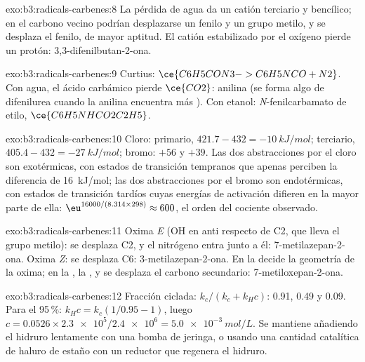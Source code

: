 \begin{solution}{exo:b3:radicals-carbenes:8}
La pérdida de agua da un catión terciario y bencílico; en el carbono vecino podrían desplazarse un fenilo
y un grupo metilo, y se desplaza el fenilo, de mayor aptitud. El
catión estabilizado por el oxígeno pierde un protón: 3,3-difenilbutan-2-ona.
\end{solution}

\begin{solution}{exo:b3:radicals-carbenes:9}
Curtius: $\ce{C6H5CON3 -> C6H5NCO + N2}$. Con agua, el ácido carbámico pierde $\ce{CO2}$: anilina
(se forma algo de difenilurea cuando la anilina encuentra más ). Con etanol: \textit{N}-fenilcarbamato
de etilo, $\ce{C6H5NHCO2C2H5}$.
\end{solution}

\begin{solution}{exo:b3:radicals-carbenes:10}
Cloro: primario, $421.7 - 432 = \qty{-10}{kJ/mol}$; terciario, $405.4 - 432 = \qty{-27}{kJ/mol}$; bromo: $+56$ y
$+39$. Las dos abstracciones por el cloro son exotérmicas, con estados de transición tempranos que
apenas perciben la diferencia de \qty{16}{kJ/mol}; las dos abstracciones por el bromo son endotérmicas,
con estados de transición tardíos cuyas energías de activación difieren en la mayor parte de ella:
$\eu^{16000/(8.314 \times 298)} \approx 600$, el orden del cociente observado.
\end{solution}

\begin{solution}{exo:b3:radicals-carbenes:11}
Oxima \textit{E} (OH en anti respecto de C2, que lleva el grupo metilo): se desplaza C2, y el nitrógeno entra
junto a él: 7-metilazepan-2-ona. Oxima \textit{Z}: se desplaza C6: 3-metilazepan-2-ona. En la
 decide la geometría de la oxima; en la ,
la , y se desplaza el carbono secundario:
7-metiloxepan-2-ona.
\end{solution}

\begin{solution}{exo:b3:radicals-carbenes:12}
Fracción ciclada: $k_c/(k_c + k_H c)$: 0.91, 0.49 y 0.09. Para el 95\,\%: $k_Hc = k_c(1/0.95 - 1)$, luego
$c = 0.0526 \times \num{2.3e5}/\num{2.4e6} = \qty{5.0e-3}{mol/L}$. Se mantiene añadiendo el hidruro lentamente con una
bomba de jeringa, o usando una cantidad catalítica de haluro de estaño con un reductor
que regenera el hidruro.
\end{solution}

